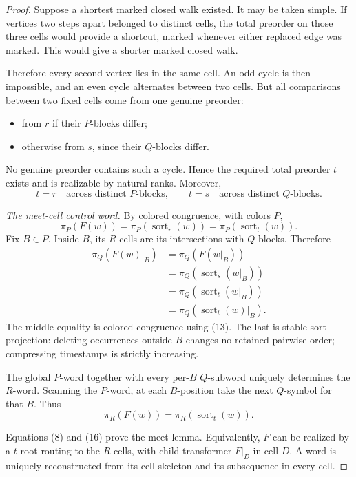 \documentclass{amsart}
\theoremstyle{plain}
\theoremstyle{definition}
\begin{document}
\begin{proof}
Suppose a shortest marked closed walk existed. It may be taken simple. If vertices two steps apart belonged to distinct cells, the total preorder on those three cells would provide a shortcut, marked whenever either replaced edge was marked. This would give a shorter marked closed walk.

Therefore every second vertex lies in the same cell. An odd cycle is then impossible, and an even cycle alternates between two cells. But all comparisons between two fixed cells come from one genuine preorder:
\begin{itemize}
\item from $r$ if their $P$-blocks differ;
\item otherwise from $s$, since their $Q$-blocks differ.
\end{itemize}
No genuine preorder contains such a cycle. Hence the required total preorder $t$ exists and is realizable by natural ranks. Moreover,
\begin{equation*}
t=r\quad\text{across distinct $P$-blocks},\qquad
t=s\quad\text{across distinct $Q$-blocks}. \tag{13}
\end{equation*}

\smallskip\noindent\textit{The meet-cell control word.} By colored congruence, with colors $P$,
\begin{equation*}
\pi_P(F(w))
=\pi_P(\operatorname{sort}_r(w))
=\pi_P(\operatorname{sort}_t(w)). \tag{14}
\end{equation*}
Fix $B\in P$. Inside $B$, its $R$-cells are its intersections with $Q$-blocks. Therefore
\begin{equation*}
\begin{aligned}
\pi_Q(F(w)|_B)
&=\pi_Q(F(w|_B))\\
&=\pi_Q(\operatorname{sort}_s(w|_B))\\
&=\pi_Q(\operatorname{sort}_t(w|_B))\\
&=\pi_Q(\operatorname{sort}_t(w)|_B).
\end{aligned} \tag{15}
\end{equation*}
The middle equality is colored congruence using (13). The last is stable-sort projection: deleting occurrences outside $B$ changes no retained pairwise order; compressing timestamps is strictly increasing.

The global $P$-word together with every per-$B$ $Q$-subword uniquely determines the $R$-word. Scanning the $P$-word, at each $B$-position take the next $Q$-symbol for that $B$. Thus
\begin{equation*}
\pi_R(F(w))
=
\pi_R(\operatorname{sort}_t(w)). \tag{16}
\end{equation*}

Equations (8) and (16) prove the meet lemma. Equivalently, $F$ can be realized by a $t$-root routing to the $R$-cells, with child transformer $F|_D$ in cell $D$. A word is uniquely reconstructed from its cell skeleton and its subsequence in every cell.
\end{proof}
\end{document}
